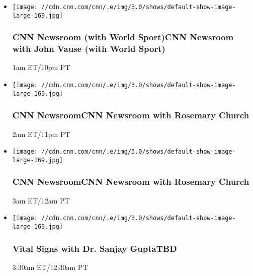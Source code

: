 \begin{itemize}
\item
  \texttt{[image: //cdn.cnn.com/cnn/.e/img/3.0/shows/default-show-image-large-169.jpg]}

  \hypertarget{cnn-newsroom-with-world-sportcnn-newsroom-with-john-vause-with-world-sport--3}{%
  \subsubsection{CNN Newsroom (with World Sport)CNN Newsroom with John
  Vause (with World Sport)
  }\label{cnn-newsroom-with-world-sportcnn-newsroom-with-john-vause-with-world-sport--3}}

  1am ET/10pm PT
\end{itemize}

\begin{itemize}
\item
  \texttt{[image: //cdn.cnn.com/cnn/.e/img/3.0/shows/default-show-image-large-169.jpg]}

  \hypertarget{cnn-newsroomcnn-newsroom-with-rosemary-church--4}{%
  \subsubsection{CNN NewsroomCNN Newsroom with Rosemary Church
  }\label{cnn-newsroomcnn-newsroom-with-rosemary-church--4}}

  2am ET/11pm PT
\end{itemize}

\begin{itemize}
\item
  \texttt{[image: //cdn.cnn.com/cnn/.e/img/3.0/shows/default-show-image-large-169.jpg]}

  \hypertarget{cnn-newsroomcnn-newsroom-with-rosemary-church--5}{%
  \subsubsection{CNN NewsroomCNN Newsroom with Rosemary Church
  }\label{cnn-newsroomcnn-newsroom-with-rosemary-church--5}}

  3am ET/12am PT
\end{itemize}

\begin{itemize}
\item
  \texttt{[image: //cdn.cnn.com/cnn/.e/img/3.0/shows/default-show-image-large-169.jpg]}

  \hypertarget{vital-signs-with-dr-sanjay-guptatbd--4}{%
  \subsubsection{Vital Signs with Dr. Sanjay GuptaTBD
  }\label{vital-signs-with-dr-sanjay-guptatbd--4}}

  3:30am ET/12:30am PT
\end{itemize}

